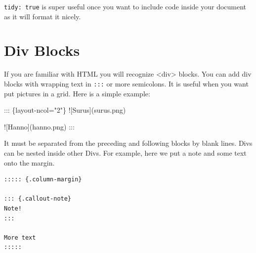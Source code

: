 \documentclass[
  letterpaper,
]{book}
\newenvironment{Shaded}{\begin{snugshade}}{\end{snugshade}}
\newcommand{\AlertTok}[1]{\textcolor[rgb]{0.68,0.00,0.00}{#1}}
\newcommand{\NormalTok}[1]{\textcolor[rgb]{0.00,0.23,0.31}{#1}}
\begin{document}
\texttt{tidy:\ true} is super useful once you want to include code
inside your document as it will format it nicely.

\hypertarget{div-blocks}{%
\section{Div Blocks}\label{div-blocks}}

If you are familiar with HTML you will recognize
\textless div\textgreater{} blocks. You can add div blocks with wrapping
text in \texttt{:::} or more semicolons. It is useful when you want put
pictures in a grid. Here is a simple example:

\begin{Shaded}
\begin{Highlighting}[]
\NormalTok{::: \{layout{-}ncol="2"\}}
\AlertTok{![Surus](surus.png)}

\AlertTok{![Hanno](hanno.png)}
\NormalTok{:::}
\end{Highlighting}
\end{Shaded}

It must be separated from the preceding and following blocks by blank
lines. Divs can be nested inside other Divs. For example, here we put a
note and some text onto the margin.

\begin{verbatim}
::::: {.column-margin}

::: {.callout-note}
Note!
:::

More text
:::::
\end{verbatim}

\end{document}
